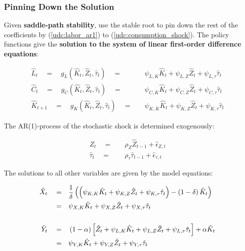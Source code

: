 \documentclass[10pt,c,aspectratio=1610,handout]{beamer}
\begin{document}
\begin{frame}%
  \frametitle{Pinning Down the Solution}%
  Given \textbf{saddle-path stability}, use the stable root to pin down the rest of the coefficients by (\ref{udc:labor_ar1}) to (\ref{udc:consumption_shock}). The policy functions give the \textbf{solution to the system of linear first-order difference equations}:%
  \begin{footnotesize}%
    \begin{align*}%
      \hat{L}_t \quad = \quad g_L \left(\hat{K}_t, \hat{Z}_{t}, \hat{\tau}_{t}\right) \quad = & \quad \psi_{L,K} \hat{K}_{t} + \psi_{L,Z} \hat{Z}_{t} + \psi_{L,\tau} \hat{\tau}_{t}\\%
      \hat{C}_t \quad = \quad g_C \left(\hat{K}_t, \hat{Z}_{t}, \hat{\tau}_{t}\right) \quad = & \quad \psi_{C,K} \hat{K}_{t} + \psi_{C,Z} \hat{Z}_{t} + \psi_{C,\tau} \hat{\tau}_{t}\\%
      \hat{K}_{t+1} \quad = \quad g_K \left(\hat{K}_t, \hat{Z}_{t}, \hat{\tau}_{t}\right) \quad = & \quad \psi_{K,K} \hat{K}_{t} + \psi_{K,Z} \hat{Z}_{t} + \psi_{K,\tau} \hat{\tau}_{t}%
    \end{align*}%
  \end{footnotesize}%
  \pause%
  The AR(1)-process of the stochastic shock is determined exogenously:%
  \begin{footnotesize}%
    \begin{align*}%
      \hat{Z}_t \quad = & \quad \rho_Z \hat{Z}_{t-1} + \hat{\epsilon}_{Z,t}\\%
      \hat{\tau}_t \quad = & \quad \rho_\tau \hat{\tau}_{t-1} + \hat{\epsilon}_{\tau,t}%
    \end{align*}%
  \end{footnotesize}%
  \pause%
  The solutions to all other variables are given by the model equations:%
  \begin{footnotesize}%
    \begin{align}%
      \hat{X}_t \quad = & \quad \frac{1}{\delta} \left( \left(\psi_{K,K} \hat{K}_{t} + \psi_{K,Z} \hat{Z}_{t} + \psi_{K,\tau} \hat{\tau}_{t} \right) - \left(1-\delta\right) \hat{K}_{t}\right)\notag\\%
      = & \quad \psi_{X,K} \hat{K}_{t} + \psi_{X,Z} \hat{Z}_{t} + \psi_{X,\tau} \hat{\tau}_{t}\\%
      \notag\\%
      \hat{Y}_t \quad = & \quad \left(1-\alpha\right) \left[ \hat{Z}_{t} + \psi_{L,K} \hat{K}_{t} + \psi_{L,Z} \hat{Z}_{t} + \psi_{L,\tau} \hat{\tau}_{t} \right] + \alpha \hat{K}_{t}\notag\\%
      = & \quad \psi_{Y,K} \hat{K}_{t} + \psi_{Y,Z} \hat{Z}_{t} + \psi_{Y,\tau} \hat{\tau}_{t}%
    \end{align}%
  \end{footnotesize}%
\end{frame}%
\end{document}
